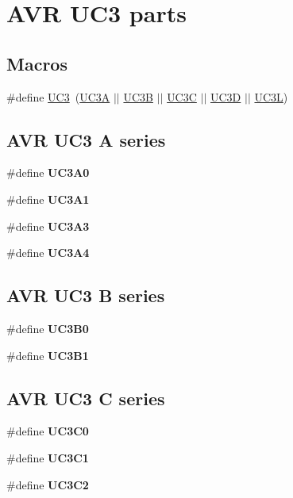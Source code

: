 \hypertarget{group__uc3__part__macros__group}{}\section{A\+V\+R U\+C3 parts}
\label{group__uc3__part__macros__group}
\subsection*{Macros}
\begin{DoxyCompactItemize}
\item 
\#define \hyperlink{group__uc3__part__macros__group_ga848d950beec67bc702bfcfdecc70bb5b}{U\+C3}~(\hyperlink{group__uc3__part__macros__group_gaf7f16cc2bde7daf34576983fee8824c8}{U\+C3\+A} $\vert$$\vert$ \hyperlink{group__uc3__part__macros__group_ga61e51606324c212eb11079e5acf592e0}{U\+C3\+B} $\vert$$\vert$ \hyperlink{group__uc3__part__macros__group_gac7a13b9ceb67804d94b6a8967512ee71}{U\+C3\+C} $\vert$$\vert$ \hyperlink{group__uc3__part__macros__group_ga351a876f40669641e6ba9620909143d3}{U\+C3\+D} $\vert$$\vert$ \hyperlink{group__uc3__part__macros__group_gac8a7d715e500aa74cd05e0f0fc5bb005}{U\+C3\+L})
\end{DoxyCompactItemize}
\subsection*{A\+V\+R U\+C3 A series}
\begin{DoxyCompactItemize}
\item 
\#define {\bfseries U\+C3\+A0}
\item 
\#define {\bfseries U\+C3\+A1}
\item 
\#define {\bfseries U\+C3\+A3}
\item 
\#define {\bfseries U\+C3\+A4}
\end{DoxyCompactItemize}
\subsection*{A\+V\+R U\+C3 B series}
\begin{DoxyCompactItemize}
\item 
\#define {\bfseries U\+C3\+B0}
\item 
\#define {\bfseries U\+C3\+B1}
\end{DoxyCompactItemize}
\subsection*{A\+V\+R U\+C3 C series}
\begin{DoxyCompactItemize}
\item 
\#define {\bfseries U\+C3\+C0}
\item 
\#define {\bfseries U\+C3\+C1}
\item 
\#define {\bfseries U\+C3\+C2}
\end{DoxyCompactItemize}
